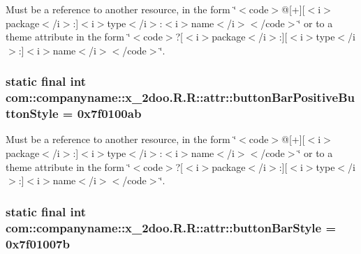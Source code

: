 Must be a reference to another resource, in the form \char`\"{}$<$code$>$@\mbox{[}+\mbox{]}\mbox{[}$<$i$>$package$<$/i$>$:\mbox{]}$<$i$>$type$<$/i$>$:$<$i$>$name$<$/i$>$$<$/code$>$\char`\"{} or to a theme attribute in the form \char`\"{}$<$code$>$?\mbox{[}$<$i$>$package$<$/i$>$:\mbox{]}\mbox{[}$<$i$>$type$<$/i$>$:\mbox{]}$<$i$>$name$<$/i$>$$<$/code$>$\char`\"{}. \hypertarget{classcom_1_1companyname_1_1x__2doo_1_1_r_1_1attr_805bf14f1ef88f05c40b3ae123c240f4}{
\subsubsection[{buttonBarPositiveButtonStyle}]{\setlength{\rightskip}{0pt plus 5cm}static final int com::companyname::x\_\-2doo.R.R::attr::buttonBarPositiveButtonStyle = 0x7f0100ab}}
\label{classcom_1_1companyname_1_1x__2doo_1_1_r_1_1attr_805bf14f1ef88f05c40b3ae123c240f4}


Must be a reference to another resource, in the form \char`\"{}$<$code$>$@\mbox{[}+\mbox{]}\mbox{[}$<$i$>$package$<$/i$>$:\mbox{]}$<$i$>$type$<$/i$>$:$<$i$>$name$<$/i$>$$<$/code$>$\char`\"{} or to a theme attribute in the form \char`\"{}$<$code$>$?\mbox{[}$<$i$>$package$<$/i$>$:\mbox{]}\mbox{[}$<$i$>$type$<$/i$>$:\mbox{]}$<$i$>$name$<$/i$>$$<$/code$>$\char`\"{}. \hypertarget{classcom_1_1companyname_1_1x__2doo_1_1_r_1_1attr_88e4aa5a715ecf555b65b28bce9589f5}{
\subsubsection[{buttonBarStyle}]{\setlength{\rightskip}{0pt plus 5cm}static final int com::companyname::x\_\-2doo.R.R::attr::buttonBarStyle = 0x7f01007b}}
\label{classcom_1_1companyname_1_1x__2doo_1_1_r_1_1attr_88e4aa5a715ecf555b65b28bce9589f5}


